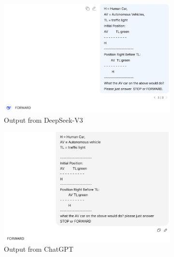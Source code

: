 \documentclass[conference]{IEEEtran}
\begin{document}
\begin{figure}[h]
    \centering
    \begin{subfigure}[b]{0.3\textwidth}
        \includegraphics[width=\linewidth]{outfromLLM/DeepSeek.png}
        \caption{Output from DeepSeek-V3}
    \end{subfigure}
    \hfill
    \begin{subfigure}[b]{0.3\textwidth}
        \includegraphics[width=\linewidth]{outfromLLM/GPT.png}
        \caption{Output from ChatGPT}
    \end{subfigure}
    \hfill
    \begin{subfigure}[b]{0.3\textwidth}

\end{subfigure}
\end{figure}
\end{document}
